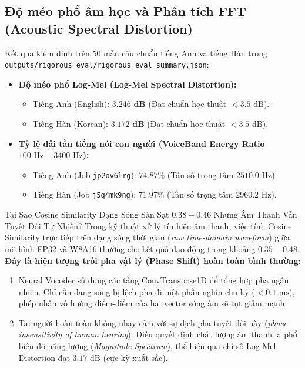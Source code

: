 \documentclass[11pt,a4paper,oneside,table]{report}
\begin{document}
\subsection{Độ méo phổ âm học và Phân tích FFT (Acoustic Spectral Distortion)}
Kết quả kiểm định trên 50 mẫu câu chuẩn tiếng Anh và tiếng Hàn trong \texttt{outputs/rigorous\_eval/rigorous\_eval\_summary.json}:
\begin{itemize}
    \item \textbf{Độ méo phổ Log-Mel (Log-Mel Spectral Distortion):}
    \begin{itemize}
        \item Tiếng Anh (English): $\mathbf{3.246\text{ dB}}$ (Đạt chuẩn học thuật $< 3.5\text{ dB}$).
        \item Tiếng Hàn (Korean): $\mathbf{3.172\text{ dB}}$ (Đạt chuẩn học thuật $< 3.5\text{ dB}$).
    \end{itemize}
    \item \textbf{Tỷ lệ dải tần tiếng nói con người (VoiceBand Energy Ratio $100\text{ Hz} - 3400\text{ Hz}$):}
    \begin{itemize}
        \item Tiếng Anh (Job \texttt{jp2ov6lrg}): $\mathbf{74.87\%}$ (Tần số trọng tâm $2510.0\text{ Hz}$).
        \item Tiếng Hàn (Job \texttt{j5q4mk9ng}): $\mathbf{71.97\%}$ (Tần số trọng tâm $2960.2\text{ Hz}$).
    \end{itemize}
\end{itemize}

\begin{technicalbox}{Tại Sao Cosine Similarity Dạng Sóng Sàn Sạt $0.38 - 0.46$ Nhưng Âm Thanh Vẫn Tuyệt Đối Tự Nhiên?}
Trong kỹ thuật xử lý tín hiệu âm thanh, việc tính Cosine Similarity trực tiếp trên dạng sóng thời gian (\textit{raw time-domain waveform}) giữa mô hình FP32 và W8A16 thường cho kết quả dao động trong khoảng $0.35 - 0.48$. \textbf{Đây là hiện tượng trôi pha vật lý (Phase Shift) hoàn toàn bình thường}:
\begin{enumerate}
    \item Neural Vocoder sử dụng các tầng ConvTranspose1D để tổng hợp pha ngẫu nhiên. Chỉ cần dạng sóng bị lệch pha đi một phần nghìn chu kỳ ($< 0.1\text{ ms}$), phép nhân vô hướng điểm-điểm của hai vector sóng âm sẽ tụt giảm mạnh.
    \item Tai người hoàn toàn không nhạy cảm với sự dịch pha tuyệt đối này (\textit{phase insensitivity of human hearing}). Điều quyết định chất lượng âm thanh là phổ biên độ năng lượng (\textit{Magnitude Spectrum}), thể hiện qua chỉ số Log-Mel Distortion đạt $3.17\text{ dB}$ (cực kỳ xuất sắc).
\end{enumerate}
\end{technicalbox}
\end{document}
